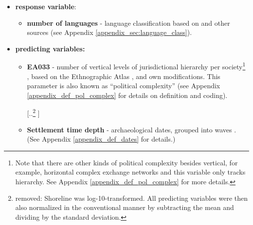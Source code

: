 \documentclass[unnumsec,webpdf,modern,medium]{oup-authoring-template}
\providecommand{\DIFaddtex}[1]{{\protect\color{blue} \sf #1}} %
\providecommand{\DIFdeltex}[1]{{\protect\color{red} [..\footnote{removed: #1} ]}} %
\providecommand{\DIFaddbegin}{} %
\providecommand{\DIFaddend}{} %
\providecommand{\DIFdelbegin}{} %
\providecommand{\DIFdelend}{} %
\providecommand{\DIFadd}[1]{\texorpdfstring{\DIFaddtex{#1}}{#1}} %
\providecommand{\DIFdel}[1]{\texorpdfstring{\DIFdeltex{#1}}{}} %
\newcommand{\DIFscaledelfig}{0.5}
\newlength{\DIFdelgraphicswidth} %
\newlength{\DIFdelgraphicsheight} %
\newcommand{\DIFaddincludegraphics}[2][]{{\color{blue}\fbox{\DIFOincludegraphics[#1]{#2}}}} %
\newcommand{\DIFdelincludegraphics}[2][]{%
\sbox{\DIFdelgraphicsbox}{\DIFOincludegraphics[#1]{#2}}%
\settoboxwidth{\DIFdelgraphicswidth}{\DIFdelgraphicsbox} %
\settoboxtotalheight{\DIFdelgraphicsheight}{\DIFdelgraphicsbox} %
\scalebox{\DIFscaledelfig}{%
\parbox[b]{\DIFdelgraphicswidth}{\usebox{\DIFdelgraphicsbox}\\[-\baselineskip] \rule{\DIFdelgraphicswidth}{0em}}\llap{\resizebox{\DIFdelgraphicswidth}{\DIFdelgraphicsheight}{%
\setlength{\unitlength}{\DIFdelgraphicswidth}%
\begin{picture}(1,1)%
\thicklines\linethickness{2pt} %
{\color[rgb]{1,0,0}\put(0,0){\framebox(1,1){}}}%
{\color[rgb]{1,0,0}\put(0,0){\line( 1,1){1}}}%
{\color[rgb]{1,0,0}\put(0,1){\line(1,-1){1}}}%
\end{picture}%
}\hspace*{3pt}}} %
} %
\DeclareRobustCommand{\DIFaddbegin}{\DIFOaddbegin \let\includegraphics\DIFaddincludegraphics} %
\DeclareRobustCommand{\DIFaddend}{\DIFOaddend \let\includegraphics\DIFOincludegraphics} %
\DeclareRobustCommand{\DIFdelbegin}{\DIFOdelbegin \let\includegraphics\DIFdelincludegraphics} %
\DeclareRobustCommand{\DIFdelend}{\DIFOaddend \let\includegraphics\DIFOincludegraphics} %
\begin{document}
\DIFdelbegin %
\DIFdelend \DIFaddbegin \begin{itemize}
\item \DIFadd{\textbf{response variable}:
}\begin{itemize}
\item \DIFadd{\textbf{number of languages} - language classification based on \citet{glottolog40} and other sources (see Appendix \ref{appendix_sec:language_class}).
}\end{itemize}
\item \DIFadd{\textbf{predicting variables:}
}\begin{itemize}
\DIFaddend 

\DIFdelbegin \DIFdel{\texttt{Number of languages \textasciitilde{} Political complexity (mode)} + }%
\DIFdel{\texttt{Environmental PC1  *  Shoreline (log10 +} }%
\DIFdel{\texttt{Environmental PC2  *  Shoreline (log10 +} }%
\DIFdel{(\texttt{Environmental PC3 *  Shoreline (log10) +} }%
\DIFdel{\texttt{Settlement order *  Shoreline (log10)} }%
\DIFdelend \DIFaddbegin \item \DIFadd{\textbf{EA033} - number of vertical levels of jurisdictional hierarchy per society}\footnote{\DIFadd{Note that there are other kinds of political complexity besides vertical, for example, horizontal complex exchange networks and this variable only tracks hierarchy. See Appendix \ref{appendix_def_pol_complex} for more details.}}\DIFadd{, based on the Ethnographic Atlas \citep{gray1998ethnographic, d_place_all}, \citet{sheehan2018coevolution} and own modifications. This parameter is also known as ``political complexity'' (see Appendix \ref{appendix_def_pol_complex} for details on definition and coding).
}\DIFaddend 

\DIFdelbegin \DIFdel{Shoreline was log-10-transformed. All predicting variables were then also normalized in the conventional manner by subtracting the mean and dividing by the standard deviation. }\DIFdelend \DIFaddbegin \item \DIFadd{\textbf{Settlement time depth} - archaeological dates, grouped into waves \citep{intoh2007reconnaissance, intoh2008ongoing, rieth_cochrane_2018, levin_seikel_miles_2019, pol_outliers_stat_art, Napolitano_et_al_yap}. (See Appendix \ref{appendix_def_dates} for details.)
}\DIFaddend 


\end{itemize}
\end{itemize}
\end{document}
